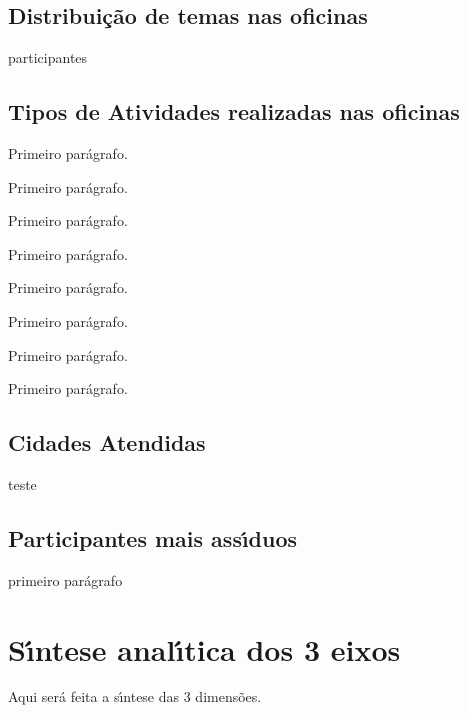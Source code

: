 \documentclass[
12pt,		%
openright,	%
twoside,  %
a4paper,			%
chapter=TITLE,		%
english,			%
french,				%
spanish,			%
brazil				%
]{USPSC-classe/USPSC}
\begin{document}
\subsection[Distribui\c{c}\~ao de temas nas oficinas]{Distribui\c{c}\~ao de temas nas oficinas}\label{Distribui\c{c}\~ao de temas nas oficinas}
participantes




\subsection[Tipos de Atividades realizadas nas oficinas]{Tipos de Atividades realizadas nas oficinas}\label{Tipos de Atividades realizadas nas oficinas}
Primeiro par\'agrafo.




Primeiro par\'agrafo.




Primeiro par\'agrafo.




Primeiro par\'agrafo.




Primeiro par\'agrafo.




Primeiro par\'agrafo.




Primeiro par\'agrafo.




Primeiro par\'agrafo.




\subsection[Cidades Atendidas]{Cidades Atendidas}\label{Cidades Atendidas}
teste




\subsection[Participantes mais ass\'{\i}duos]{Participantes mais ass\'{\i}duos}\label{Participantes mais ass\'{\i}duos}
primeiro par\'agrafo




\section[S\'{\i}ntese anal\'{\i}tica dos 3 eixos]{S\'{\i}ntese anal\'{\i}tica dos 3 eixos}\label{S\'{\i}ntese anal\'{\i}tica dos 3 eixos}
Aqui ser\'a feita a s\'{\i}ntese das 3 dimens\~oes.
\end{document}

